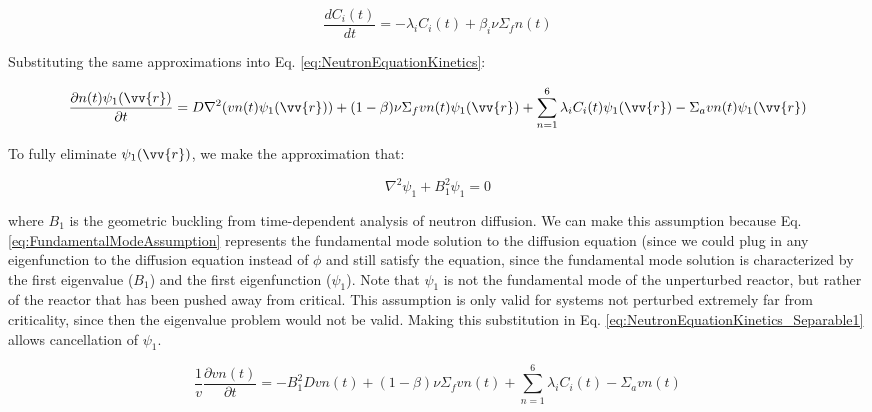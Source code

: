 \documentclass[10pt]{article}
\begin{document}
\begin{flushleft}
\begin{equation}
\label{eq:PrecursorEquationKinetics_Separable1}
\frac{dC_i(t)}{dt}=-\lambda_i C_i(t) + \beta_i \nu\Sigma_f n(t)
\end{equation} 

Substituting the same approximations into Eq. \ref{eq:NeutronEquationKinetics}:

\begin{equation}
\label{eq:NeutronEquationKinetics_Separable1}
\frac{\partial n(t)\psi_1(\vv{r})}{\partial t}=D\nabla^2(vn(t)\psi_1(\vv{r})) + (1-\beta)\nu\Sigma_fvn(t)\psi_1(\vv{r}) + \sum_{n=1}^{6} \lambda_i C_i(t)\psi_1(\vv{r}) -\Sigma_avn(t)\psi_1(\vv{r})
\end{equation} 

To fully eliminate \(\psi_1(\vv{r})\), we make the approximation that:

\begin{equation}
\label{eq:FundamentalModeAssumption}
\nabla^2\psi_1+B_{1}^{2}\psi_1=0
\end{equation} 

where \(B_1\) is the geometric buckling from time-dependent analysis of neutron diffusion. We can make this assumption because Eq. \ref{eq:FundamentalModeAssumption} represents the fundamental mode solution to the diffusion equation (since we could plug in any eigenfunction to the diffusion equation instead of \(\phi\) and still satisfy the equation, since the fundamental mode solution is characterized by the first eigenvalue (\(B_1\)) and the first eigenfunction (\(\psi_1\)). Note that \(\psi_1\) is not the fundamental mode of the unperturbed reactor, but rather of the reactor that has been pushed away from critical. This assumption is only valid for systems not perturbed extremely far from criticality, since then the eigenvalue problem would not be valid. Making this substitution in Eq. \ref{eq:NeutronEquationKinetics_Separable1} allows cancellation of \(\psi_1\).

\begin{equation}
\label{eq:NeutronEquationKinetics_Separable2}
\frac{1}{v}\frac{\partial vn(t)}{\partial t}=-B_{1}^{2}Dvn(t) + (1-\beta)\nu\Sigma_fvn(t) + \sum_{n=1}^{6} \lambda_i C_i(t) -\Sigma_{a}vn(t)
\end{equation} 


\end{flushleft}
\end{document}
